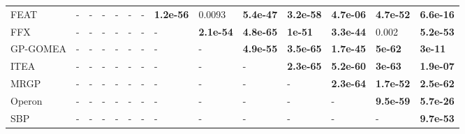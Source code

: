 \begin{table}
\begin{tabular}{llllllllllllll}
FEAT      &                - &                - &                - &                - &                - &                - &  \textbf{1.2e-56} &           0.0093 &  \textbf{5.4e-47} &  \textbf{3.2e-58} &  \textbf{4.7e-06} &  \textbf{4.7e-52} &  \textbf{6.6e-16} \\
FFX       &                - &                - &                - &                - &                - &                - &                - &  \textbf{2.1e-54} &  \textbf{4.8e-65} &    \textbf{1e-51} &  \textbf{3.3e-44} &            0.002 &  \textbf{5.2e-53} \\
GP-GOMEA  &                - &                - &                - &                - &                - &                - &                - &                - &  \textbf{4.9e-55} &  \textbf{3.5e-65} &  \textbf{1.7e-45} &    \textbf{5e-62} &    \textbf{3e-11} \\
ITEA      &                - &                - &                - &                - &                - &                - &                - &                - &                - &  \textbf{2.3e-65} &  \textbf{5.2e-60} &    \textbf{3e-63} &  \textbf{1.9e-07} \\
MRGP      &                - &                - &                - &                - &                - &                - &                - &                - &                - &                - &  \textbf{2.3e-64} &  \textbf{1.7e-52} &  \textbf{2.5e-62} \\
Operon    &                - &                - &                - &                - &                - &                - &                - &                - &                - &                - &                - &  \textbf{9.5e-59} &  \textbf{5.7e-26} \\
SBP       &                - &                - &                - &                - &                - &                - &                - &                - &                - &                - &                - &                - &  \textbf{9.7e-53} \\
\bottomrule
\end{tabular}
\end{table}

